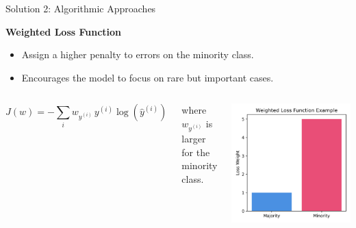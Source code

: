 \documentclass[serif, aspectratio=169]{beamer}
\begin{document}
    \begin{frame}{Solution 2: Algorithmic Approaches}

        \textbf{Weighted Loss Function}

        \begin{itemize}\itemsep0.8em
        \item Assign a higher penalty to errors on the minority class.
        \item Encourages the model to focus on rare but important cases.
        \end{itemize}

        \vspace{0.5em}

        \begin{columns}[c,onlytextwidth]
            \[
                J(w) = - \sum_{i} w_{y^{(i)}} \, y^{(i)} \log(\hat{y}^{(i)})
            \]
            \scriptsize
            \begin{center}
                where $w_{y^{(i)}}$ is larger for the minority class.
            \end{center}

            \centering
            \includegraphics[width=0.8\linewidth]{pic/Figure_36.png}\\
        \end{columns}

    \end{frame}
\end{document}
